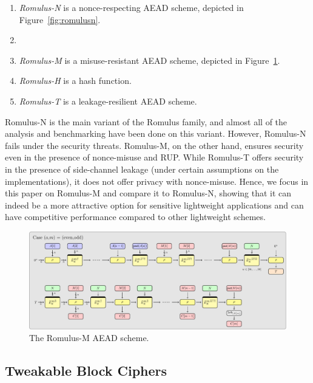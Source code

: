\documentclass[conference]{IEEEtran}
\begin{document}
\begin{enumerate}
\item {\it Romulus-N} is a nonce-respecting AEAD scheme, depicted in Figure~\ref{fig:romulusn}.
\item \item {\it Romulus-M} is a misuse-resistant AEAD scheme, depicted in Figure~\ref{fig:romulusm}.
\item {\it Romulus-H} is a hash function.
\item {\it Romulus-T} is a leakage-resilient AEAD scheme.
\end{enumerate}

Romulus-N is the main variant of the Romulus family, and almost all of the analysis and benchmarking have been done on this variant. However, Romulus-N fails under the security threats. Romulus-M, on the other hand, ensures security even in the presence of nonce-misuse and RUP. While Romulus-T offers security in the presence of side-channel leakage (under certain assumptions on the implementations), it does not offer privacy with nonce-misuse. Hence, we focus in this paper on Romulus-M and compare it to Romulus-N, showing that it can indeed be a more attractive option for sensitive lightweight applications and can have competitive performance compared to other lightweight schemes.

\begin{figure}[!t]
  \centering
  \includegraphics[width=\textwidth]{figures/modeM_simplified.pdf}
  \caption{The Romulus-M AEAD scheme.}\label{fig:romulusm}
\end{figure}

\subsection{Tweakable Block Ciphers}
\end{document}
